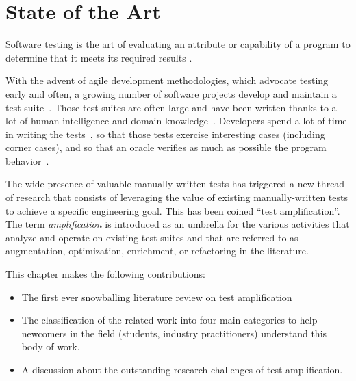 \chapter{State of the Art}
\label{chap:sota}

\minitoc

\graphicspath{{.}{chapitres/state-of-the-art/}}

Software testing is the art of evaluating an attribute or capability of a program to determine that it meets its required results \cite{hetzel1988}. 

With the advent of agile development methodologies, which advocate testing early and often, a growing number of software projects develop and maintain a test suite~\cite{Madeyski2010}. 
Those test suites are often large and have been written thanks to a lot of human intelligence and domain knowledge~\cite{azaidmanEMSE2011,DBLP:conf/icst/ZaidmanRDD08}. 
\label{stmt:sota:dvlpers-write-tests}Developers spend a lot of time in writing the tests~\cite{BellerTSE,beller2015when,beller2015howmuch}, so that those tests exercise interesting cases (including corner cases), and so that an oracle verifies as much as possible the program behavior~\cite{hilton2018coverageevolution}.

The wide presence of valuable manually written tests has triggered a new thread of research that consists of leveraging the value of existing manually-written tests to achieve a specific engineering goal.
This has been coined ``test amplification''.
The term \emph{amplification} is introduced as an umbrella for the various activities that analyze and operate on existing test suites and that are referred to as augmentation, optimization, enrichment, or refactoring in the literature. 

This chapter makes the following contributions:
\begin{itemize}
	\item The first ever snowballing literature review on test amplification
	\item The classification of the related work into four main categories to help newcomers in the field  (students, industry practitioners)  understand this body of work.
	\item A discussion about the outstanding research challenges of test amplification.
\end{itemize}

